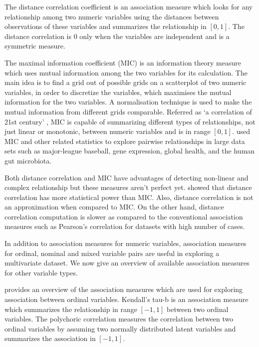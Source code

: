 The distance correlation coefficient \citep{szekely2007measuring} is an
association measure which looks for any relationship among two numeric
variables using the distances between observations of these variables
and summarizes the relationship in \([0,1]\). The distance correlation
is \(0\) only when the variables are independent and is a symmetric
measure.

The maximal information coefficient (MIC) \citep{reshef2011detecting} is
an information theory measure which uses mutual information among the
two variables for its calculation. The main idea is to find a grid out
of possible grids on a scatterplot of two numeric variables, in order to
discretize the variables, which maximises the mutual information for the
two variables. A normalisation technique is used to make the mutual
information from different grids comparable. Referred as `a correlation
of 21st century' \citep{speed2011correlation}, MIC is capable of
summarizing different types of relationships, not just linear or
monotonic, between numeric variables and is in range \([0,1]\).
\citet{reshef2011detecting} used MIC and other related statistics to
explore pairwise relationships in large data sets such as major-league
baseball, gene expression, global health, and the human gut microbiota.

Both distance correlation and MIC have advantages of detecting
non-linear and complex relationship but these measures aren't perfect
yet. \citet{commentSimonTibshirani} showed that distance correlation has
more statistical power than MIC. Also, distance correlation is not an
approximation when compared to MIC. On the other hand, distance
correlation computation is slower as compared to the conventional
association measures such as Pearson's correlation for datasets with
high number of cases.

In addition to association measures for numeric variables, association
measures for ordinal, nominal and mixed variable pairs are useful in
exploring a multivariate dataset. We now give an overview of available
association measures for other variable types.

\citet{agresti2010analysis} provides an overview of the association
measures which are used for exploring association between ordinal
variables. Kendall's tau-b \citep{kendall1945treatment} is an
association measure which summarizes the relationship in range
\([-1,1]\) between two ordinal variables. The polychoric correlation
\citep{olsson1979maximum} measures the correlation between two ordinal
variables by assuming two normally distributed latent variables and
summarizes the association in \([-1,1]\).

